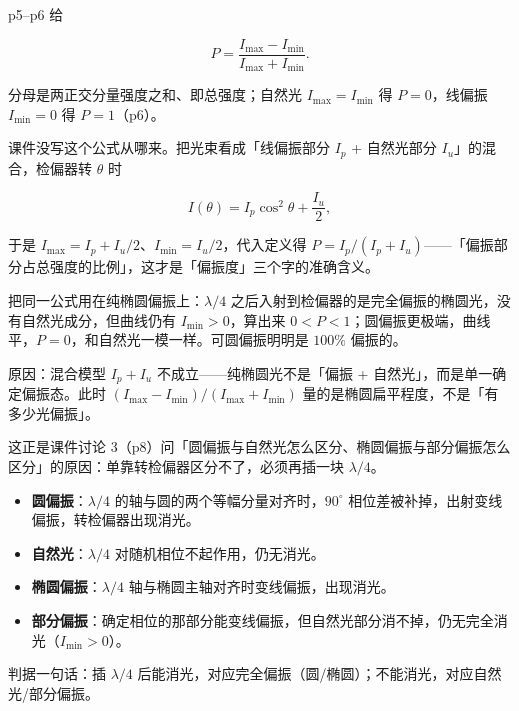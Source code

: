 \documentclass[11pt]{ctexart}
\begin{document}


p5--p6 给

\[ P=\frac{I_{\max}-I_{\min}}{I_{\max}+I_{\min}}. \]

分母是两正交分量强度之和、即总强度；自然光 $I_{\max}=I_{\min}$ 得 $P=0$，线偏振 $I_{\min}=0$ 得 $P=1$（p6）。

课件没写这个公式从哪来。把光束看成「线偏振部分 $I_p$ + 自然光部分 $I_u$」的混合，检偏器转 $\theta$ 时

\[ I(\theta)=I_p\cos^2\theta+\frac{I_u}{2}, \]

于是 $I_{\max}=I_p+I_u/2$、$I_{\min}=I_u/2$，代入定义得 $P=I_p/(I_p+I_u)$——「偏振部分占总强度的比例」，这才是「偏振度」三个字的准确含义。


把同一公式用在纯椭圆偏振上：$\lambda/4$ 之后入射到检偏器的是完全偏振的椭圆光，没有自然光成分，但曲线仍有 $I_{\min}>0$，算出来 $0<P<1$；圆偏振更极端，曲线平，$P=0$，和自然光一模一样。可圆偏振明明是 $100\%$ 偏振的。

原因：混合模型 $I_p+I_u$ 不成立——纯椭圆光不是「偏振 + 自然光」，而是单一确定偏振态。此时 $(I_{\max}-I_{\min})/(I_{\max}+I_{\min})$ 量的是椭圆扁平程度，不是「有多少光偏振」。

这正是课件讨论 3（p8）问「圆偏振与自然光怎么区分、椭圆偏振与部分偏振怎么区分」的原因：单靠转检偏器区分不了，必须再插一块 $\lambda/4$。


\begin{itemize}
\item \textbf{圆偏振}：$\lambda/4$ 的轴与圆的两个等幅分量对齐时，$90^\circ$ 相位差被补掉，出射变线偏振，转检偏器出现消光。
\item \textbf{自然光}：$\lambda/4$ 对随机相位不起作用，仍无消光。
\item \textbf{椭圆偏振}：$\lambda/4$ 轴与椭圆主轴对齐时变线偏振，出现消光。
\item \textbf{部分偏振}：确定相位的那部分能变线偏振，但自然光部分消不掉，仍无完全消光（$I_{\min}>0$）。
\end{itemize}

判据一句话：插 $\lambda/4$ 后能消光，对应完全偏振（圆/椭圆）；不能消光，对应自然光/部分偏振。

\end{document}
